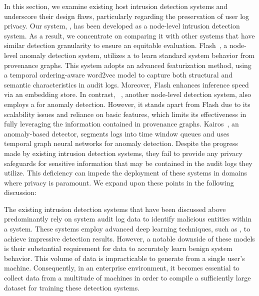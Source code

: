 
In this section, we examine existing host intrusion detection systems and underscore their design flaws, particularly regarding the preservation of user log privacy. Our system, \Sys, has been developed as a node-level intrusion detection system. As a result, we concentrate on comparing it with other systems that have similar detection granularity to ensure an equitable evaluation. Flash~\cite{flash2024}, a node-level anomaly detection system, utilizes a \gnn to learn standard system behavior from provenance graphs. This system adopts an advanced featurization method, using a temporal ordering-aware word2vec model to capture both structural and semantic characteristics in audit logs. Moreover, Flash enhances inference speed via an \gnnshort embedding store. In contrast, \threatrace~\cite{wang2022threatrace}, another node-level detection system, also employs a \gnn for anomaly detection. However, it stands apart from Flash due to its scalability issues and reliance on basic features, which limits its effectiveness in fully leveraging the information contained in provenance graphs. Kairos~\cite{cheng2023kairos}, an anomaly-based detector, segments logs into time window queues and uses temporal graph neural networks for anomaly detection. Despite the progress made by existing intrusion detection systems, they fail to provide any privacy safeguards for sensitive information that may be contained in the audit logs they utilize. This deficiency can impede the deployment of these systems in domains where privacy is paramount. We expand upon these points in the following discussion: 

 The existing intrusion detection systems that have been discussed above predominantly rely on system audit log data to identify malicious entities within a system. These systems employ advanced deep learning techniques, such as \gnn, to achieve impressive detection results. However, a notable downside of these models is their substantial requirement for data to accurately learn benign system behavior. This volume of data is impracticable to generate from a single user's machine. Consequently, in an enterprise environment, it becomes essential to collect data from a multitude of machines in order to compile a sufficiently large dataset for training these detection systems. 


